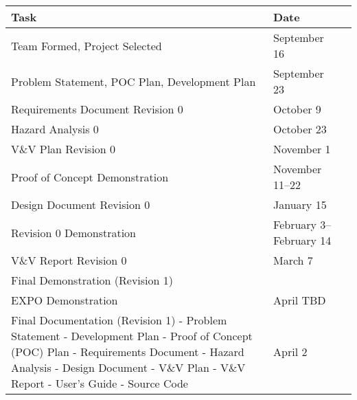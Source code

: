 \documentclass{article}
\begin{document}
\noindent \begin{tabular}{ p{5.7cm} l r}
    
    \textbf{Task} & \textbf{Date} \\
    \toprule
    Team Formed, Project Selected & September 16 \\
 
    Problem Statement, POC Plan, Development Plan & September 23 \\
 
    Requirements Document Revision 0 & October 9 \\
 
    Hazard Analysis 0 & October 23 \\
 
    V\&V Plan Revision 0 & November 1 \\
 
    Proof of Concept Demonstration & November 11--22 \\
 
    Design Document Revision 0 & January 15 \\
 
    Revision 0 Demonstration & February 3--February 14\\
 
    V\&V Report Revision 0 & March 7 \\
 
    Final Demonstration (Revision 1) \\
 
    EXPO Demonstration & April TBD \\
 
    Final Documentation (Revision 1)\newline 
     - Problem Statement\newline
     - Development Plan\newline
     - Proof of Concept (POC) Plan\newline
     - Requirements Document\newline
     - Hazard Analysis\newline
     - Design Document\newline
     - V\&V Plan\newline
     - V\&V Report\newline
     - User's Guide\newline
     - Source Code\newline &  April 2\\
   
 \end{tabular}
 
\end{document}

